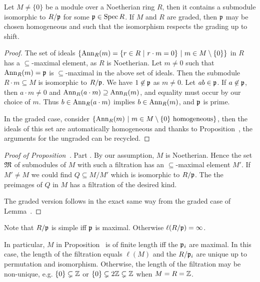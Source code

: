 \documentclass[a4paper,parskip=half,numbers=enddot, DIV=12]{scrreprt}
\begin{document}
\begin{lem}
    Let $M\neq\{0\}$ be a module over a Noetherian ring $R$,  then it contains a submodule isomorphic to $R/\mathfrak{p}$ for some $\mathfrak{p}\in \operatorname{Spec} R$. If $M$ and $R$ are graded, then $\mathfrak{p}$ may be chosen homogeneous and such that the isomorphism respects the grading up to shift.
\end{lem}
\begin{proof}
    The set of ideals $\left\{\operatorname{Ann}_R(m) = \left\{r\in R\ \middle|\  r\cdot m = 0\right\} \ \middle|\  m\in M\setminus \{0\}\right\}$ in $R$ has a $\subseteq$-maximal element, as $R$ is Noetherian. Let $m\neq 0$ such that $\operatorname{Ann}_R(m) = \mathfrak{p}$ is $\subseteq$-maximal in the above set of ideals. Then the submodule $R\cdot m \subseteq M$ is isomorphic to $R/\mathfrak{p}$. We have $1\not\in \mathfrak{p}$ as $m\neq 0$. Let $ab\in \mathfrak{p}$. If $a\not\in\mathfrak{p}$, then $a\cdot m \neq 0$ and $\operatorname{Ann}_R(a\cdot m)\supseteq \operatorname{Ann}_R(m)$, and equality must occur by our choice of $m$. Thus $b\in \operatorname{Ann}_R(a\cdot m)$ implies $b\in \operatorname{Ann}_R(m)$, and $\mathfrak{p}$ is prime.
    
    In the graded case, consider $\left\{\operatorname{Ann}_R(m)\ \middle|\  m\in M\setminus\{0\}\text{ homogeneous}\right\}$, then the ideals of this set are automatically homogeneous and thanks to Proposition~, the arguments for the ungraded can be recycled.
\end{proof}
\begin{proof}[Proof of Proposition~]
    Part . By our assumption, $M$ is Noetherian. Hence the set $\mathfrak{M}$ of submodules of $M$ with such a filtration has an $\subseteq$-maximal element $M'$. If $M'\neq M$ we could find $Q\subseteq M/M'$ which is isomorphic to $R/\mathfrak{p}$. The the preimages of $Q$ in $M$ has a filtration of the desired kind.
    
    The graded version  follows in the exact same way from the graded case of Lemma~.
\end{proof}
\begin{rem*}
    \begin{alphanumerate}
    \item 
        Note that $R/\mathfrak{p}$ is simple iff $\mathfrak{p}$ is maximal. Otherwise $\ell(R/\mathfrak{p}) = \infty$.
    \item 
        In particular, $M$ in Proposition~ is of finite length iff the $\mathfrak{p}_i$ are maximal. In this case, the length of the filtration equals $\ell(M)$ and the $R/\mathfrak{p}_i$ are unique up to permutation and isomorphism. Otherwise, the length of the filtration may be non-unique, e.g. $\{0\}\subsetneq \mathbb{Z}$ or $\{0\}\subsetneq 2\mathbb{Z} \subsetneq \mathbb{Z}$ when $M=R=\mathbb{Z}$.
    \end{alphanumerate}
\end{rem*}
\end{document}
